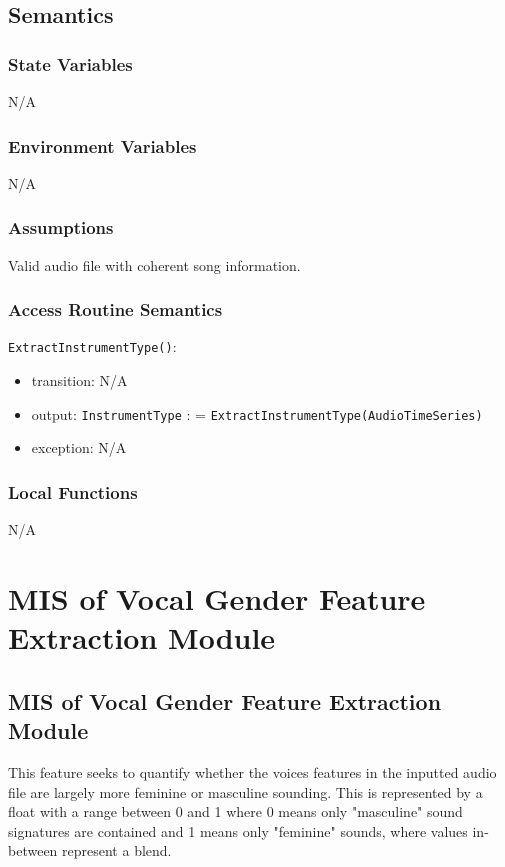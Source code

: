 \documentclass[12pt, titlepage]{article}
\begin{document}
\subsection{Semantics}

\subsubsection{State Variables}
N/A

\subsubsection{Environment Variables}
N/A

\subsubsection{Assumptions}
Valid audio file with coherent song information.

\subsubsection{Access Routine Semantics}

\noindent \texttt{ExtractInstrumentType()}:
\begin{itemize}
\item transition: N/A
\item output: \texttt{Instrument\textunderscore Type} : = \texttt{ExtractInstrumentType(Audio\textunderscore Time\textunderscore Series)}
\item exception: N/A 
\end{itemize}

\subsubsection{Local Functions}
N/A


\section{MIS of Vocal Gender Feature Extraction Module} 

\subsection{MIS of Vocal Gender Feature Extraction Module}
This feature seeks to quantify whether the voices features in the inputted audio file 
are largely more feminine or masculine sounding. This is represented by a float with a range between
0 and 1 where 0 means only "masculine" sound signatures are contained and 1 means only "feminine" sounds,
where values in-between represent a blend. 
\end{document}
